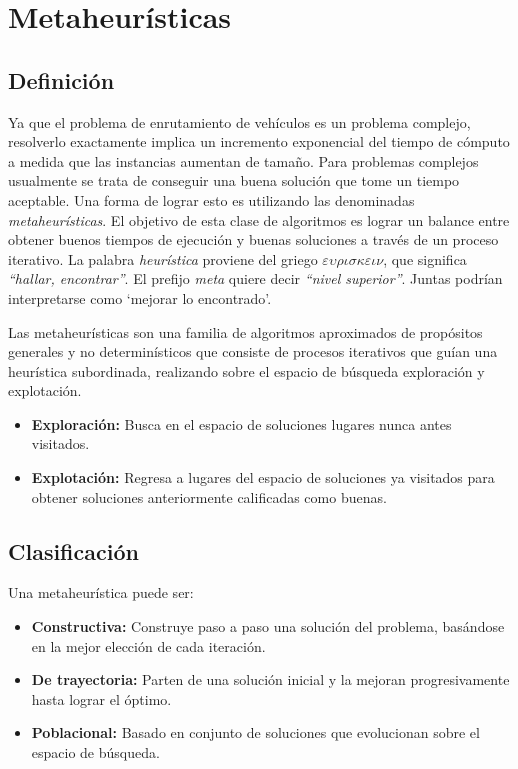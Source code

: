 \chapter{Metaheurísticas} \label{chap:metaheuristicas}

\section{Definición} \label{sect:definicion}

Ya que el problema de enrutamiento de vehículos es un problema complejo, resolverlo exactamente implica un incremento exponencial del tiempo de cómputo a medida que las instancias aumentan de tamaño. Para problemas complejos usualmente se trata de conseguir una buena solución que tome un tiempo aceptable. Una forma de lograr esto es utilizando las denominadas \emph{metaheurísticas}. El objetivo de esta clase de algoritmos  es lograr un balance entre obtener buenos tiempos de ejecución y buenas soluciones a través de un proceso iterativo. La palabra \emph{heurística} proviene del griego $\varepsilon\upsilon\rho\iota\sigma\kappa\varepsilon\iota\nu$, que significa \emph{``hallar, encontrar''}. El prefijo \emph{meta} quiere decir \emph{``nivel superior''}. Juntas podrían interpretarse como `mejorar lo encontrado'.

Las metaheurísticas son una familia de algoritmos aproximados de propósitos generales y no determinísticos que consiste de procesos iterativos que guían una heurística subordinada, realizando sobre el espacio de búsqueda exploración y explotación.
\begin{itemize}
\item \textbf{Exploración:} Busca en el espacio de soluciones lugares nunca antes visitados. 
\item \textbf{Explotación:} Regresa a lugares del espacio de soluciones ya visitados para obtener soluciones anteriormente calificadas como buenas.
\end{itemize}

\section{Clasificación} \label{sect:clasificacion}
Una metaheurística puede ser:

\begin{itemize}
\item \textbf{Constructiva:} Construye paso a paso una solución del problema, basándose en la mejor elección de cada iteración.
\item \textbf{De trayectoria:} Parten de una solución inicial y la mejoran progresivamente hasta lograr el óptimo.
\item \textbf{Poblacional:} Basado en conjunto de soluciones que evolucionan sobre el espacio de búsqueda.
\end{itemize}

